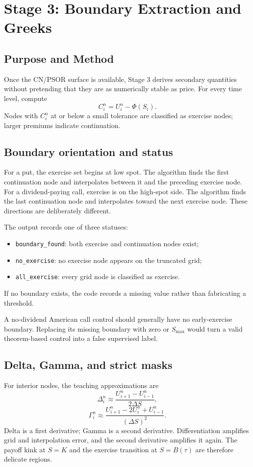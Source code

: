 \section{Stage 3: Boundary Extraction and Greeks}

\subsection{Purpose and Method}
Once the CN/PSOR surface is available, Stage 3 derives secondary quantities
without pretending that they are as numerically stable as price. For every time
level, compute
\[
  C_i^n=U_i^n-\Phi(S_i).
\]
Nodes with \(C_i^n\) at or below a small tolerance are classified as exercise
nodes; larger premiums indicate continuation.

\subsection{Boundary orientation and status}
For a put, the exercise set begins at low spot. The algorithm finds the first
continuation node and interpolates between it and the preceding exercise node.
For a dividend-paying call, exercise is on the high-spot side. The algorithm
finds the last continuation node and interpolates toward the next exercise
node. These directions are deliberately different.

The output records one of three statuses:
\begin{itemize}
  \item \texttt{boundary\_found}: both exercise and continuation nodes exist;
  \item \texttt{no\_exercise}: no exercise node appears on the truncated grid;
  \item \texttt{all\_exercise}: every grid node is classified as exercise.
\end{itemize}
If no boundary exists, the code records a missing value rather than fabricating
a threshold.

\begin{commonconfusion}
A no-dividend American call control should generally have no early-exercise
boundary. Replacing its missing boundary with zero or \(S_{\max}\) would turn a
valid theorem-based control into a false supervised label.
\end{commonconfusion}

\subsection{Delta, Gamma, and strict masks}
For interior nodes, the teaching approximations are
\[
  \Delta_i^n
  \approx
  \frac{U_{i+1}^n-U_{i-1}^n}{2\Delta S},
\]
\[
  \Gamma_i^n
  \approx
  \frac{U_{i+1}^n-2U_i^n+U_{i-1}^n}{(\Delta S)^2}.
\]
Delta is a first derivative; Gamma is a second derivative. Differentiation
amplifies grid and interpolation error, and the second derivative amplifies it
again. The payoff kink at \(S=K\) and the exercise transition at \(S=B(\tau)\)
are therefore delicate regions.

